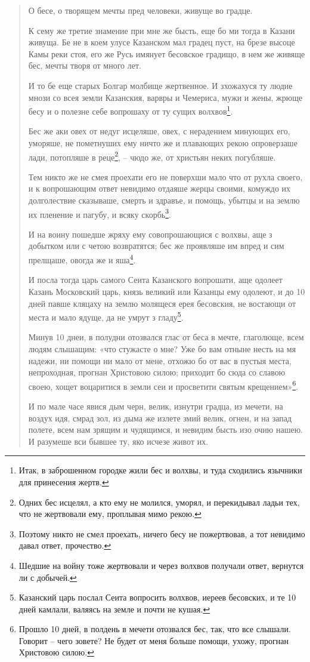 \begin{quotation}
О бесе, о творящем мечты пред человеки, живуще во градце.

К сему же третие знамение при мне же бысть, еще бо ми тогда в Казани живуща. Бе не в коем улусе Казанском мал градец пуст, на брезе высоце Камы реки стоя, его же Русь имянует бесовское градищо, в нем же живяще бес, мечты творя от много лет.

И то бе еще старых Болгар молбище жертвенное. И зхожахуся ту людие мнози со всея земли Казанския, варвры и Чемериса, мужи и жены, жрюще бесу и о полезне себе вопрошаху от ту сущих волхвов\footnote{Итак, в заброшенном городке жили бес и волхвы, и туда сходились язычники для принесения жертв.}. 

Бес же аки овех от недуг исцеляше, овех, с нерадением минующих его, уморяше, не пометнуших ему ничто же и плавающих рекою опроверзаше лади, потопляше в реце\footnote{Одних бес исцелял, а кто ему не молился, уморял, и перекидывал ладьи тех, что не жертвовали ему, проплывая мимо рекою.}, – чюдо же, от христьян неких погубляше.

Тем никто же не смея проехати его не поверхши мало что от рухла своего, и к вопрошающим ответ невидимо отдаяше жерцы своими, комуждо их долголествие сказываше, смерть и здравъе, и помощь, убытцы и на землю их пленение и пагубу, и всяку скорбь\footnote{Поэтому никто не смел проехать, ничего бесу не пожертвовав, а тот невидимо давал ответ, прочество.}.

И на воину пошедше жряху ему совопрошающися с волхвы, аще з добытком или с четою возвратятся; бес же проявляше им впред и сим прелщаше, овогда же и яша\footnote{Шедшие на войну тоже жертвовали и через волхвов получали ответ, вернутся ли с добычей.}.

И посла тогда царь самого Сеита Казанского вопрошати, аще одолеет Казань Московский царь, князь великий или Казанцы ему одолеют, и до 10 дней павше кляцаху на землю молящеся ерея бесовския, не востающи от места и мало ядуще, да не умрут з гладу\footnote{Казанский царь послал Сеита вопросить волхвов, иереев бесовских, и те 10 дней камлали, валяясь на земле и почти не кушая.}.

Минув 10 днеи, в полудни отозвался глас от беса в мечте, глаголюще, всем людям слышащим: «что стужасте о мне? Уже бо вам отныне несть на мя надежи, ни помощи ни мало от мене, отхожю бо от вас в пустыя места, непроходная, прогнан Христовою силою; приходит бо сюда со славою своею, хощет воцаритися в земли сеи и просветити святым крещением»\footnote{Прошло 10 дней, в полдень в мечети отозвался бес, так, что все слышали. Говорит – чего зовете? Не будет от меня больше помощи, ухожу, прогнан Христовою силою.}.

И по мале часе явися дым черн, велик, изнутри градца, из мечети, на воздух идя, смрад зол, из дыма же излете змий велик, огнен, и на запад полете, всем нам зрящим и чудящимся, и невидим бысть изо очию нашею. И разумеше вси бывшее ту, яко исчезе живот их.
\end{quotation}

